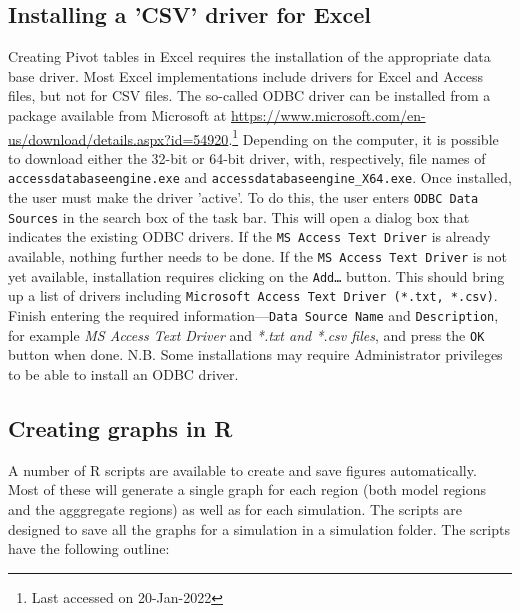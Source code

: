 \subsection{Installing a 'CSV' driver for Excel}

Creating Pivot tables in Excel requires the installation of the appropriate data base
driver. Most Excel implementations include drivers for Excel and Access files, but
not for CSV files. The so-called ODBC driver can be installed from a package
available from Microsoft at \url{https://www.microsoft.com/en-us/download/details.aspx?id=54920}.\footnote{Last accessed
on 20-Jan-2022} Depending on the computer, it is possible to download either the 32-bit
or 64-bit driver, with, respectively, file names of \texttt{accessdatabaseengine.exe} and
\texttt{accessdatabaseengine\_X64.exe}. Once installed, the user must make the driver 'active'.
To do this, the user enters \texttt{ODBC Data Sources} in the search box of the task
bar. This will open a dialog box that indicates the existing ODBC drivers. If the
\texttt{MS Access Text Driver} is already available, nothing further needs to be done.
If the \texttt{MS Access Text Driver} is not yet available, installation requires
clicking on the \texttt{Add\ldots} button. This should bring up a list of drivers including
\texttt{Microsoft Access Text Driver (*.txt, *.csv)}. Finish entering the required
information---\texttt{Data
Source Name} and \texttt{Description}, for example \emph{MS Access Text Driver} and
\emph{*.txt and *.csv files},
and press the \texttt{OK} button when done. N.B. Some installations may
require Administrator privileges to be able to install an ODBC driver.

\subsection{Creating graphs in R}

A number of R scripts are available to create and save figures automatically. Most
of these will generate a single graph for each region (both model regions and the
agggregate regions) as well as for each simulation. The scripts are designed
to save all the graphs for a simulation in a simulation folder. The scripts have
the following outline:

